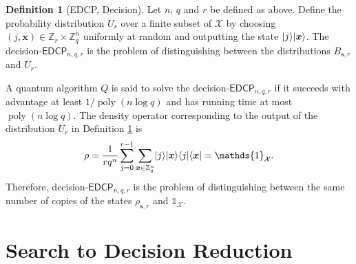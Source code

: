 \documentclass[11pt]{article}
\theoremstyle{plain}
\theoremstyle{definition}
\newtheorem{definition}[theorem]{Definition}
\DeclareMathOperator{\poly}{poly}
\DeclarePairedDelimiter{\ket}{\lvert}{\rangle}
\DeclarePairedDelimiter{\bra}{\langle}{\rvert}
\def\Z{\ensuremath{\mathbb{Z}}}
\def\edcp{\ensuremath{\mathsf{EDCP}}}
\begin{document}
\begin{definition}[EDCP, Decision]
    \label{def:d-edcp}
    Let $n$, $q$ and $r$ be defined as above. Define the probability distribution $U_{r}$ over a finite subset of $\mathcal{X}$ by choosing $(j, \bm{x}) \in \Z_r \times \Z_q^n$ uniformly at random and outputting the state $\ket{j}\ket{\bm{x}}$. The decision-$\edcp_{n, q, r}$ is the problem of distinguishing between the distributions $B_{\bm{s}, r}$ and $U_r$.
\end{definition}
A quantum algorithm $Q$ is said to solve the decision-$\edcp_{n, q, r}$ if it succeeds with advantage at least $1 / \poly(n\log q)$ and has running time at most $\poly(n\log q)$. The density operator corresponding to the output of the distribution $U_r$ in Definition \ref{def:d-edcp} is
\[ \rho = \frac{1}{rq^n} \sum_{j = 0}^{r - 1} \sum_{\bm{x} \in \Z_q^n}  \ket{j}\ket{\bm{x}} \bra{j}\bra{\bm{x}} = \mathds{1}_{\mathcal{X}}. \]
Therefore, decision-$\edcp_{n, q, r}$ is the problem of distinguishing between the same number of copies of the states $\rho_{\bm{s}, r}$ and $\mathds{1}_{\mathcal{X}}$. 





\section{Search to Decision Reduction}
\end{document}
